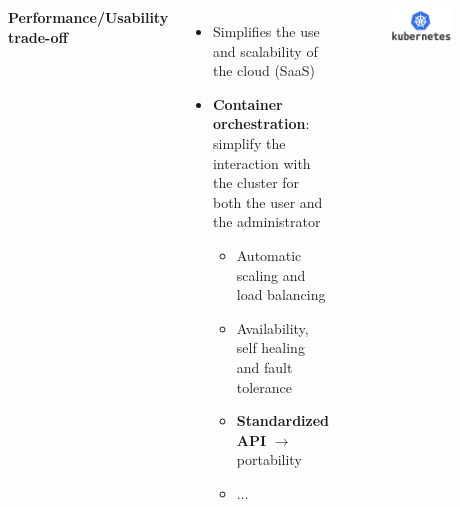 \begin{frame}
  \vspace{0.2em}
  \begin{columns}
     \textbf{Performance/Usability trade-off}
    \begin{itemize}
      \itemsep0em
      \item \alert{Simplifies the use} and \alert{scalability} of the cloud (SaaS)
      \item \alert{\textbf{Container orchestration}}: simplify the interaction
        with the cluster for both the user and the administrator
      \begin{itemize}
        \itemsep0em
        \item Automatic scaling and load balancing
        \item Availability, self healing and fault tolerance
        \item \alert{\textbf{Standardized API}} $\to$ portability
        \item $\dots$
      \end{itemize}
    \end{itemize}
    \begin{figure}
      \centering
      \includegraphics[width=0.75\textwidth]{img/logos/kubernetes-logo}
    \end{figure}
    \end{columns}
\end{frame}
